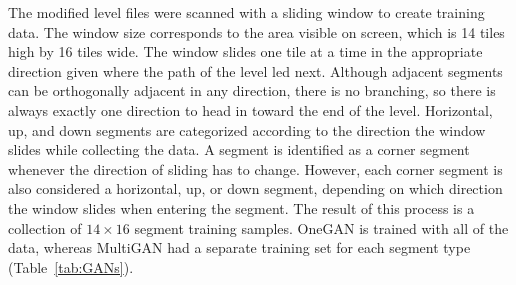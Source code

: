 






The modified level files were scanned with a sliding window to create training data. The window size corresponds to the area visible on screen, which is 14 tiles high by 16 tiles wide. The window slides one tile at a time in the appropriate direction given where the path of the level led next. %
Although adjacent segments can be orthogonally adjacent in any direction, there is no branching, so there is always exactly one direction to head in toward the end of the level. 
Horizontal, up, and down segments are categorized according to the direction the window slides while collecting the data. A segment is identified as a corner segment whenever the direction of sliding has to change. However, each corner segment is also considered 
a horizontal, up, or down segment, depending on which direction the window slides when entering the segment.
The result of this process is a collection of $14 \times 16$ segment training samples. OneGAN is trained with all of the data, whereas MultiGAN had a separate training set for each segment type (Table~\ref{tab:GANs}).


